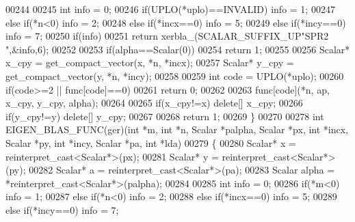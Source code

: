\begin{DoxyCode}
00244 
00245   \textcolor{keywordtype}{int} info = 0;
00246   \textcolor{keywordflow}{if}(UPLO(*uplo)==INVALID)                                            info = 1;
00247   \textcolor{keywordflow}{else} \textcolor{keywordflow}{if}(*n<0)                                                       info = 2;
00248   \textcolor{keywordflow}{else} \textcolor{keywordflow}{if}(*incx==0)                                                   info = 5;
00249   \textcolor{keywordflow}{else} \textcolor{keywordflow}{if}(*incy==0)                                                   info = 7;
00250   \textcolor{keywordflow}{if}(info)
00251     \textcolor{keywordflow}{return} xerbla\_(SCALAR\_SUFFIX\_UP\textcolor{stringliteral}{"SPR2 "},&info,6);
00252 
00253   \textcolor{keywordflow}{if}(alpha==Scalar(0))
00254     \textcolor{keywordflow}{return} 1;
00255 
00256   Scalar* x\_cpy = get\_compact\_vector(x, *n, *incx);
00257   Scalar* y\_cpy = get\_compact\_vector(y, *n, *incy);
00258 
00259   \textcolor{keywordtype}{int} code = UPLO(*uplo);
00260   \textcolor{keywordflow}{if}(code>=2 || func[code]==0)
00261     \textcolor{keywordflow}{return} 0;
00262 
00263   func[code](*n, ap, x\_cpy, y\_cpy, alpha);
00264 
00265   \textcolor{keywordflow}{if}(x\_cpy!=x)  \textcolor{keyword}{delete}[] x\_cpy;
00266   \textcolor{keywordflow}{if}(y\_cpy!=y)  \textcolor{keyword}{delete}[] y\_cpy;
00267 
00268   \textcolor{keywordflow}{return} 1;
00269 \}
00270 
00278 \textcolor{keywordtype}{int} EIGEN\_BLAS\_FUNC(ger)(\textcolor{keywordtype}{int} *m, \textcolor{keywordtype}{int} *n, Scalar *palpha, Scalar *px, \textcolor{keywordtype}{int} *incx, Scalar *py, \textcolor{keywordtype}{int} *incy, 
      Scalar *pa, \textcolor{keywordtype}{int} *lda)
00279 \{
00280   Scalar* x = \textcolor{keyword}{reinterpret\_cast<}Scalar*\textcolor{keyword}{>}(px);
00281   Scalar* y = \textcolor{keyword}{reinterpret\_cast<}Scalar*\textcolor{keyword}{>}(py);
00282   Scalar* a = \textcolor{keyword}{reinterpret\_cast<}Scalar*\textcolor{keyword}{>}(pa);
00283   Scalar alpha = *\textcolor{keyword}{reinterpret\_cast<}Scalar*\textcolor{keyword}{>}(palpha);
00284 
00285   \textcolor{keywordtype}{int} info = 0;
00286        \textcolor{keywordflow}{if}(*m<0)                                                       info = 1;
00287   \textcolor{keywordflow}{else} \textcolor{keywordflow}{if}(*n<0)                                                       info = 2;
00288   \textcolor{keywordflow}{else} \textcolor{keywordflow}{if}(*incx==0)                                                   info = 5;
00289   \textcolor{keywordflow}{else} \textcolor{keywordflow}{if}(*incy==0)                                                   info = 7;

\end{DoxyCode}
